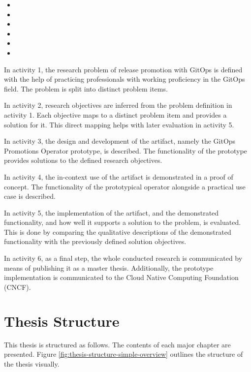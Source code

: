 \begin{itemize}
	\item {}
	\item {}
	\item {}
	\item {}
	\item {}
	\item {}
\end{itemize}

In activity 1,
the research problem of
release promotion with GitOps
is defined
with the help of practicing professionals with working proficiency in the GitOps field.
The problem is split into distinct problem items.

In activity 2,
research objectives are inferred from the problem definition in activity 1.
Each objective maps to a distinct problem item
and provides a solution for it.
This direct mapping helps with later evaluation in activity 5.

In activity 3,
the design and development of the artifact,
namely the GitOps Promotions Operator prototype,
is described.
The functionality of the prototype provides solutions
to the defined research objectives.

In activity 4,
the in-context use of the artifact is demonstrated in a proof of concept.
The functionality of the prototypical operator alongside a practical use case is described.

In activity 5,
the implementation of the artifact,
and the demonstrated functionality,
and how well it supports a solution to the problem,
is evaluated.
This is done by comparing the qualitative descriptions of the demonstrated functionality
with the previously defined solution objectives.

In activity 6, as a final step,
the whole conducted research is communicated by means of
publishing it as a master thesis.
Additionally, the prototype implementation is communicated to the Cloud Native Computing Foundation (CNCF).


\vfill

\section{Thesis Structure}
\label{introduction:thesis-structure}

This thesis
is structured as follows.
The contents of each major chapter are presented.
Figure \ref{fig:thesis-structure-simple-overview} outlines the structure of the thesis visually.


